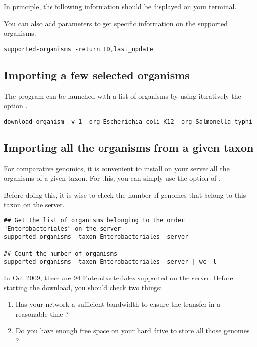 In principle, the following information should be displayed on your
terminal.


You can also add parameters to get specific information on the
supported organisms.

\begin{lstlisting}
supported-organisms -return ID,last_update
\end{lstlisting}


\subsection{Importing a few selected organisms}

The program  can be launched with a list of
organisms by using iteratively the option .


\begin{lstlisting}
download-organism -v 1 -org Escherichia_coli_K12 -org Salmonella_typhi
\end{lstlisting}

\subsection{Importing all the organisms from a given taxon}

For comparative genomics, it is convenient to install on your server
all the organisms of a given taxon. For this, you can simply use the
option  of .

Before doing this, it is wise to check the number of genomes that
belong to this taxon on the server.

\begin{lstlisting}
## Get the list of organisms belonging to the order "Enterobacteriales" on the server
supported-organisms -taxon Enterobacteriales -server

## Count the number of organisms
supported-organisms -taxon Enterobacteriales -server | wc -l
\end{lstlisting}

In Oct 2009, there are 94 Enterobacteriales supported on the \RSAT
server. Before starting the download, you should check two things:
\begin{enumerate}
\item Has your network a sufficient bandwidth to ensure the transfer
  in a reasonable time ?
\item Do you have enough free space on your hard drive to store all those genomes ? 
\end{enumerate}

